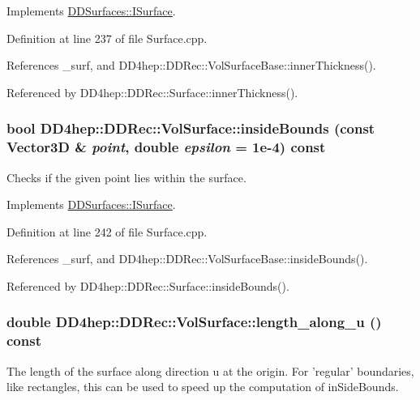 Implements \hyperlink{class_d_d_surfaces_1_1_i_surface_ab6913582dd6c1f44df2038705ce2aea6}{DDSurfaces::ISurface}.

Definition at line 237 of file Surface.cpp.

References \_\-surf, and DD4hep::DDRec::VolSurfaceBase::innerThickness().

Referenced by DD4hep::DDRec::Surface::innerThickness().\hypertarget{class_d_d4hep_1_1_d_d_rec_1_1_vol_surface_a6a3d39ebb8b0be132e4141cb9ea650a6}{
\subsubsection[{insideBounds}]{\setlength{\rightskip}{0pt plus 5cm}bool DD4hep::DDRec::VolSurface::insideBounds (const {\bf Vector3D} \& {\em point}, \/  double {\em epsilon} = {\ttfamily 1e-\/4}) const}}
\label{class_d_d4hep_1_1_d_d_rec_1_1_vol_surface_a6a3d39ebb8b0be132e4141cb9ea650a6}


Checks if the given point lies within the surface. 

Implements \hyperlink{class_d_d_surfaces_1_1_i_surface_a16aa78cb8c01cd5993b7cf23f55a7e3a}{DDSurfaces::ISurface}.

Definition at line 242 of file Surface.cpp.

References \_\-surf, and DD4hep::DDRec::VolSurfaceBase::insideBounds().

Referenced by DD4hep::DDRec::Surface::insideBounds().\hypertarget{class_d_d4hep_1_1_d_d_rec_1_1_vol_surface_ab4c1720db7c0170646211f26855ee38e}{
\subsubsection[{length\_\-along\_\-u}]{\setlength{\rightskip}{0pt plus 5cm}double DD4hep::DDRec::VolSurface::length\_\-along\_\-u () const}}
\label{class_d_d4hep_1_1_d_d_rec_1_1_vol_surface_ab4c1720db7c0170646211f26855ee38e}
The length of the surface along direction u at the origin. For 'regular' boundaries, like rectangles, this can be used to speed up the computation of inSideBounds. 

